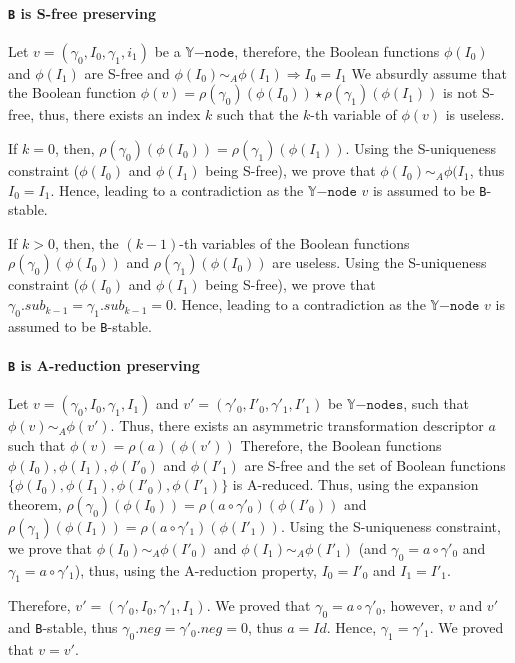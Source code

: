 \documentclass[a4paper,10pt]{article}
\newcommand{\Y}{\mathbb{Y}}
\newcommand{\Ynode}{\Y\mathtt{-node}}
\newcommand{\Ynodes}{\Y\mathtt{-nodes}}
\begin{document}
\paragraph{\texttt{B} is S-free preserving\\}
Let $v=(\gamma_0, I_0, \gamma_1, i_1)$ be a $\Ynode$, therefore, the Boolean functions $\phi(I_0)$ and $\phi(I_1)$ are S-free and $\phi(I_0) \sim_A \phi(I_1) \Rightarrow I_0 = I_1$
We absurdly assume that the Boolean function $\phi(v) = \rho(\gamma_0)(\phi(I_0)) \star \rho(\gamma_1)(\phi(I_1))$ is not S-free, thus, there exists an index $k$ such that the $k$-th variable of $\phi(v)$ is useless.
\begin{compactitem}
\item If $k=0$, then, $\rho(\gamma_0)(\phi(I_0)) = \rho(\gamma_1)(\phi(I_1))$.
Using the S-uniqueness constraint ($\phi(I_0)$ and $\phi(I_1)$ being S-free), we prove that $\phi(I_0) \sim_A \phi(I_1$, thus $I_0 = I_1$.
Hence, leading to a contradiction as the $\Ynode$ $v$ is assumed to be \texttt{B}-stable.
\item If $k>0$, then, the $(k-1)$-th variables of the Boolean functions $\rho(\gamma_0)(\phi(I_0))$ and $\rho(\gamma_1)(\phi(I_0))$ are useless.
Using the S-uniqueness constraint ($\phi(I_0)$ and $\phi(I_1)$ being S-free), we prove that $\gamma_0.sub_{k-1} = \gamma_1.sub_{k-1} = 0$.
Hence, leading to a contradiction as the $\Ynode$ $v$ is assumed to be \texttt{B}-stable.
\end{compactitem}

\paragraph{\texttt{B} is A-reduction preserving\\}
Let $v=(\gamma_0, I_0, \gamma_1, I_1)$ and $v'=(\gamma'_0, I'_0, \gamma'_1, I'_1)$ be $\Ynodes$, such that $\phi(v) \sim_A \phi(v')$.
Thus, there exists an asymmetric transformation descriptor $a$ such that $\phi(v) = \rho(a)(\phi(v'))$
Therefore, the Boolean functions $\phi(I_0), \phi(I_1), \phi(I'_0)$ and $\phi(I'_1)$ are S-free and the set of Boolean functions $\{\phi(I_0), \phi(I_1), \phi(I'_0), \phi(I'_1)\}$ is A-reduced.
Thus, using the expansion theorem, $\rho(\gamma_0)(\phi(I_0)) = \rho(a \circ \gamma'_0)(\phi(I'_0))$ and $\rho(\gamma_1)(\phi(I_1)) = \rho(a \circ \gamma'_1)(\phi(I'_1))$.
Using the S-uniqueness constraint, we prove that $\phi(I_0) \sim_A \phi(I'_0)$ and $\phi(I_1) \sim_A \phi(I'_1)$ (and $\gamma_0 = a \circ \gamma'_0$ and $\gamma_1 = a \circ \gamma'_1$), thus, using the A-reduction property, $I_0 = I'_0$ and $I_1 = I'_1$.

Therefore, $v'=(\gamma'_0, I_0, \gamma'_1, I_1)$.
We proved that $\gamma_0 = a \circ \gamma'_0$, however, $v$ and $v'$ and \texttt{B}-stable, thus $\gamma_0.neg = \gamma'_0.neg = 0$, thus $a = Id$.
Hence, $\gamma_1 = \gamma'_1$.
We proved that $v = v'$.
\end{document}

